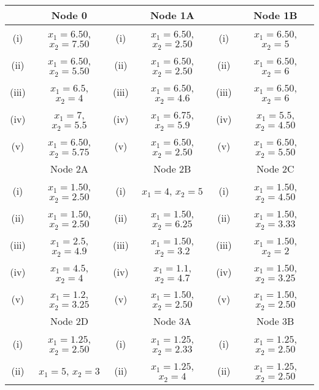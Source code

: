 \documentclass[a4paper,12pt]{article}
\begin{document}
	\large	
	\begin{tabular}{||c|c||c|c||c|c||}
		\hline  & Node 0 &   & Node 1A &  & Node 1B     \\  \hline
		\hline (i) & $x_1= 6.50$, $x_2= 7.50$ & (i) & $x_1= 6.50$, $x_2= 2.50$ &  (i)  & $x_1= 6.50$, $x_2 = 5$\\  \hline
		\hline (ii)  & $x_1= 6.50$, $x_2= 5.50$  &  (ii) & $x_1= 6.50$, $x_2= 2.50$ & (ii) & $x_1= 6.50$, $x_2 = 6 $ \\  \hline
		\hline (iii) & $x_1= 6.5$, $x_2 = 4$  & (iii) & $x_1= 6.50$, $x_2 = 4.6$ & (iii) & $x_1= 6.50$, $x_2 = 6$ \\  \hline
		\hline (iv)  & $x_1= 7$, $x_2 =5.5 $  &  (iv) & $x_1= 6.75$, $x_2 = 5.9 $ & (iv)  & $x_1= 5.5$, $x_2= 4.50$\\  \hline
		\hline (v) & $x_1= 6.50$, $x_2= 5.75$ & (v)  & $x_1= 6.50$, $x_2= 2.50$ & (v) & $x_1= 6.50$, $x_2= 5.50$\\  \hline
		\hline 
		\hline  & Node 2A &   & Node 2B &  & Node 2C  \\  \hline
		\hline (i) & $x_1= 1.50$, $x_2= 2.50$ & (i)  & $x_1= 4$, $x_2 = 5$  & (i)  & $x_1= 1.50$, $x_2 = 4.50$\\  \hline
		\hline (ii)  & $x_1= 1.50$, $x_2= 2.50$  &  (ii) & $x_1= 1.50$, $x_2 = 6.25$ & (ii) & $x_1= 1.50$, $x_2 = 3.33 $ \\  \hline
		\hline (iii) & $x_1= 2.5  $, $x_2 = 4.9 $  &  (iii) & $x_1= 1.50$, $x_2 = 3.2$ &  (iii) & $x_1= 1.50$, $x_2 = 2$ \\  \hline
		\hline (iv)  & $x_1= 4.5$, $x_2 = 4 $  & (iv) & $x_1= 1.1 $, $x_2 = 4.7 $ & (iv)  & $x_1= 1.50$, $x_2 = 3.25$\\  \hline
		\hline (v) & $x_1= 1.2 $, $x_2 = 3.25 $ & (v) & $x_1= 1.50$, $x_2= 2.50$  &(v) & $x_1= 1.50$, $x_2= 2.50$\\  \hline
		\hline 
		\hline  & Node 2D &   & Node 3A &  & Node 3B   \\  \hline
		\hline (i) & $x_1= 1.25$, $x_2= 2.50$ &  (i) & $x_1= 1.25$, $x_2 = 2.33$  & (i)  & $x_1= 1.25$, $x_2= 2.50$\\  \hline
		\hline (ii)  & $x_1= 5$, $x_2 = 3$  &  (ii) & $x_1= 1.25$, $x_2 = 4$ & (ii) & $x_1= 1.25$, $x_2= 2.50$ \\  \hline

\end{tabular}
\end{document}
